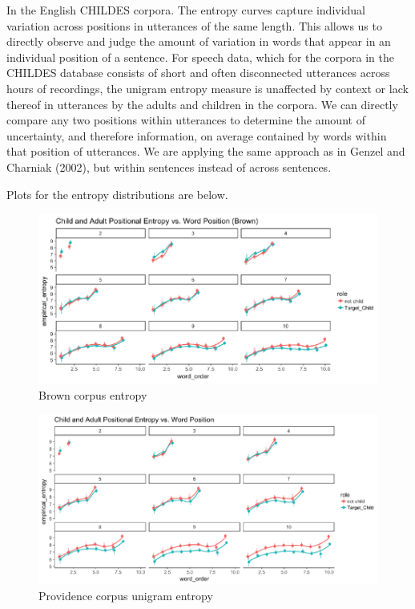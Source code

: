 \documentclass[10pt, letterpaper]{article}
\newenvironment{CodeChunk}{}{}
\begin{document}
In the English CHILDES corpora. The entropy curves capture individual
variation across positions in utterances of the same length. This allows
us to directly observe and judge the amount of variation in words that
appear in an individual position of a sentence. For speech data, which
for the corpora in the CHILDES database consists of short and often
disconnected utterances across hours of recordings, the unigram entropy
measure is unaffected by context or lack thereof in utterances by the
adults and children in the corpora. We can directly compare any two
positions within utterances to determine the amount of uncertainty, and
therefore information, on average contained by words within that
position of utterances. We are applying the same approach as in Genzel
and Charniak (2002), but within sentences instead of across sentences.

Plots for the entropy distributions are below.

\begin{CodeChunk}
\begin{figure}[h]

{\centering \includegraphics{figs/brown_PE-1} 

}

\caption[Brown corpus entropy]{Brown corpus entropy}\label{fig:brown_PE}
\end{figure}
\end{CodeChunk}

\begin{CodeChunk}
\begin{figure}[h]

{\centering \includegraphics{figs/providence_PE-1} 

}

\caption[Providence corpus unigram entropy]{Providence corpus unigram entropy}\label{fig:providence_PE}
\end{figure}
\end{CodeChunk}
\end{document}
